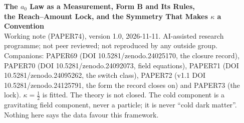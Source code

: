 \documentclass[10pt]{article}
\begin{document}
\begin{center}
{\Large\bfseries The $a_0$ Law as a Measurement, Form B and Its Rules,\\[2pt]
the Reach--Amount Lock, and the Symmetry That Makes $\kappa$ a Convention}\\[6pt]
{\small Working note (PAPER74), version 1.0, 2026-11-11. AI-assisted research programme; not peer reviewed; not
reproduced by any outside group. Companions: PAPER69 (DOI 10.5281/zenodo.24025170, the closure record),
PAPER70 (DOI 10.5281/zenodo.24092073, field equations), PAPER71 (DOI 10.5281/zenodo.24095262, the switch class),
PAPER72 (v1.1 DOI 10.5281/zenodo.24125791, the form the record closes on) and PAPER73 (the lock).
$\kappa=\tfrac12$ is fitted. The theory is not closed. The cold component is a gravitating field component,
never a particle; it is never ``cold dark matter''. Nothing here says the data favour this framework.}
\end{center}
\end{document}
